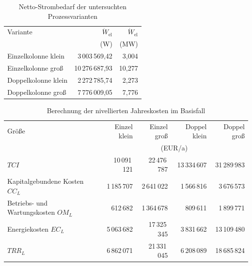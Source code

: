 \begin{table}[H]
\centering
\caption{Netto-Strombedarf der untersuchten Prozessvarianten}
\label{tab:netto_strombedarf_varianten}
\small
\begin{tabular}{lrr}
\hline
Variante & $\dot W_\mathrm{el}$ & $\dot W_\mathrm{el}$ \\
 & (W) & (MW) \\
\hline
Einzelkolonne klein 
& 3\,003\,569{,}42 
& 3{,}004 \\

Einzelkolonne groß 
& 10\,276\,687{,}93 
& 10{,}277 \\

Doppelkolonne klein 
& 2\,272\,785{,}74 
& 2{,}273 \\

Doppelkolonne groß 
& 7\,776\,009{,}05 
& 7{,}776 \\
\hline
\end{tabular}
\end{table}


\begin{table}[H]
\centering
\caption{Berechnung der nivellierten Jahreskosten im Basisfall}
\label{tab:nivellierte_jahreskosten}
\small
\begin{tabular}{lrrrr}
\hline
Größe 
& Einzel klein 
& Einzel groß 
& Doppel klein 
& Doppel groß \\
 & \multicolumn{4}{c}{(EUR/a)} \\
\hline
$TCI$ 
& 10\,091\,121
& 22\,476\,787
& 13\,334\,607
& 31\,289\,983 \\

Kapitalgebundene Kosten $CC_L$ 
& 1\,185\,707
& 2\,641\,022
& 1\,566\,816
& 3\,676\,573 \\

Betriebs- und Wartungskosten $OM_L$ 
& 612\,682
& 1\,364\,678
& 809\,611
& 1\,899\,771 \\

Energiekosten $EC_L$ 
& 5\,063\,682
& 17\,325\,345
& 3\,831\,662
& 13\,109\,480 \\
\hline

$TRR_L$ 
& 6\,862\,071
& 21\,331\,045
& 6\,208\,089
& 18\,685\,824 \\
\hline
\end{tabular}
\end{table}

